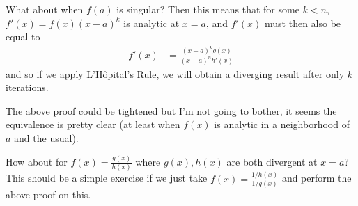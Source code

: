 \documentclass[12pt]{report}
\begin{document}
What about when $f(a)$ is singular? Then this means that for some $k < n$,
$f'(x) = f(x)(x - a)^k$ is analytic at $x = a$, and $f'(x)$ must then
also be equal to
\begin{align*}
    f'(x) &= \frac{(x - a)^kg(x)}{(x - a)^nh'(x)}
\end{align*}
and so if we apply L'H\^opital's Rule, we will obtain a diverging result after
only $k$ iterations.

The above proof could be tightened but I'm not going to bother, it seems the
equivalence is pretty clear (at least when $f(x)$ is analytic in a neighborhood
of $a$ and the usual).

How about for $f(x) = \frac{g(x)}{h(x)}$ where $g(x), h(x)$ are both divergent
at $x = a$? This should be a simple exercise if we just take $f(x) =
\frac{1/h(x)}{1/g(x)}$ and perform the above proof on this.
\end{document}

